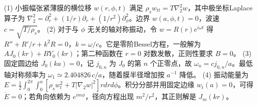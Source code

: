 (1) 小振幅张紧薄膜的横位移 \(w(r,\phi,t)\) 满足 \(\rho_s w_{tt}=T\nabla_{\!2}^2w\)，其中极坐标Laplace算子为 \(\nabla_{\!2}^2=\partial_r^2+(1/r)\partial_r+(1/r^2)\partial_\phi^2\)。边界 \(w(a,\phi,t)=0\)，波速 \(c=\sqrt{T/\rho_s}\)。
(2) 对于与 \(\phi\) 无关的轴对称振动，令 \(w=R(r)e^{i\omega t}\) 得 \(R''+R'/r+k^2R=0\)，\(k=\omega/c\)。它是零阶Bessel方程，一般解为 \(AJ_0(kr)+BY_0(kr)\)；第二种函数在 \(r=0\) 对数发散，正则性要求 \(B=0\)。
(3) 固定圆边给 \(J_0(ka)=0\)，记 \(j_{0,n}\) 为 \(J_0\) 的第 \(n\) 个正零点，故 \(\omega_n=cj_{0,n}/a\)。最低轴对称频率为 \(\omega_1\simeq2.404826\,c/a\)，随着膜半径增加按 \(a^{-1}\) 降低。
(4) 振动能量为 \(E=\frac12\int_0^{2\pi}\int_0^a[\rho_s w_t^2+T|\nabla_{\!2}w|^2]rdrd\phi\)。积分分部并用固定边缘 \(w_t(a)=0\)，可得 \(\dot E=0\)；若角向依赖为 \(e^{im\phi}\)，径向方程出现 \(m^2/r^2\)，其正则解是 \(J_m(kr)\)。
